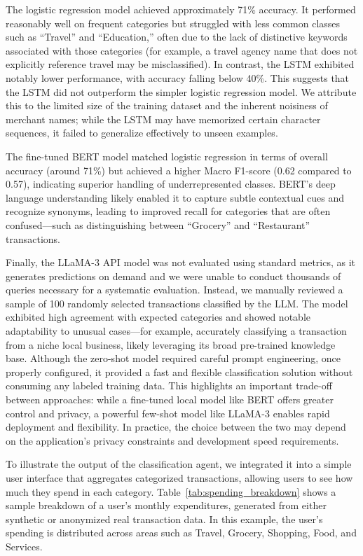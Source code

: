 \documentclass[conference]{IEEEtran}
\begin{document}
The logistic regression model achieved approximately 71\% accuracy. It performed reasonably well on frequent categories but struggled with less common classes such as “Travel” and “Education,” often due to the lack of distinctive keywords associated with those categories (for example, a travel agency name that does not explicitly reference travel may be misclassified). In contrast, the LSTM exhibited notably lower performance, with accuracy falling below 40\%. This suggests that the LSTM did not outperform the simpler logistic regression model. We attribute this to the limited size of the training dataset and the inherent noisiness of merchant names; while the LSTM may have memorized certain character sequences, it failed to generalize effectively to unseen examples.

The fine-tuned BERT model matched logistic regression in terms of overall accuracy (around 71\%) but achieved a higher Macro F1-score (0.62 compared to 0.57), indicating superior handling of underrepresented classes. BERT’s deep language understanding likely enabled it to capture subtle contextual cues and recognize synonyms, leading to improved recall for categories that are often confused—such as distinguishing between “Grocery” and “Restaurant” transactions.


Finally, the LLaMA-3 API model was not evaluated using standard metrics, as it generates predictions on demand and we were unable to conduct thousands of queries necessary for a systematic evaluation. Instead, we manually reviewed a sample of 100 randomly selected transactions classified by the LLM. The model exhibited high agreement with expected categories and showed notable adaptability to unusual cases—for example, accurately classifying a transaction from a niche local business, likely leveraging its broad pre-trained knowledge base.
Although the zero-shot model required careful prompt engineering, once properly configured, it provided a fast and flexible classification solution without consuming any labeled training data. This highlights an important trade-off between approaches: while a fine-tuned local model like BERT offers greater control and privacy, a powerful few-shot model like LLaMA-3 enables rapid deployment and flexibility. In practice, the choice between the two may depend on the application's privacy constraints and development speed requirements.


To illustrate the output of the classification agent, we integrated it into a simple user interface that aggregates categorized transactions, allowing users to see how much they spend in each category. Table~\ref{tab:spending_breakdown} shows a sample breakdown of a user’s monthly expenditures, generated from either synthetic or anonymized real transaction data. In this example, the user's spending is distributed across areas such as Travel, Grocery, Shopping, Food, and Services.
\end{document}
